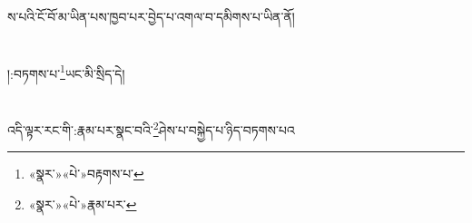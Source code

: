 ས་པའི་ངོ་བོ་མ་ཡིན་པས་ཁྱབ་པར་བྱེད་པ་འགལ་བ་དམིགས་པ་ཡིན་ནོ།\chapter{ }།:བཏགས་པ་\footnote{«སྣར་»«པེ་»བརྟགས་པ་}ཡང་མི་སྲིད་དེ།\chapter{ }འདི་ལྟར་རང་གི་:རྣམ་པར་སྣང་བའི་\footnote{«སྣར་»«པེ་»རྣམ་པར་}ཤེས་པ་བསྐྱེད་པ་ཉིད་བཏགས་པའ
